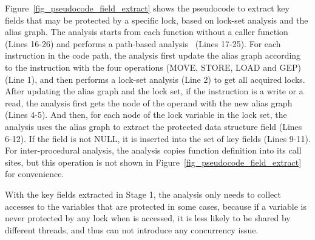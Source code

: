 Figure~\ref{fig_pseudocode_field_extract} shows the pseudocode to extract key 
fields that may be protected by a specific lock, based on lock-set analysis and 
the alias graph. The analysis starts from each function without a caller 
function (Lines 16-26) and performs a path-based analysis~\cite{Li:ASPLOS22} 
(Lines 17-25). For each instruction in the code path, the analysis first update 
the alias graph according to the instruction with the four operations (MOVE, 
STORE, LOAD and GEP) (Line 1), and then performs a lock-set analysis (Line 2) 
to get all acquired locks. After updating the alias graph and the lock set, if 
the instruction is a write or a read, the analysis first gets the node of the 
operand with the new alias graph (Lines 4-5). And then, for each node of the 
lock variable in the lock set, the analysis uses the alias graph to extract the 
protected data structure field (Lines 6-12). If the field is not NULL, it is 
inserted into the set of key fields (Lines 9-11). For inter-procedural 
analysis, the analysis copies function definition into its call sites, but this 
operation is not shown in Figure~\ref{fig_pseudocode_field_extract} for 
convenience. 

 With the key fields extracted in Stage 1, the 
analysis only needs to collect accesses to the variables that are protected in 
some cases, because if a variable is never protected by any lock when is 
accessed, it is less likely to be shared by different threads, and thus can not 
introduce any concurrency issue.

